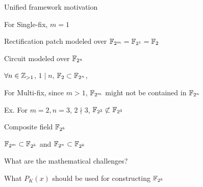 
\begin{frame}{\large Unified framework motivation}
\bi
	\item For Single-fix, $m=1$
	\bi
		\item Rectification patch modeled over ${\mathbb{F}}_{2^m} = {\mathbb{F}}_{2^1} = {\mathbb{F}}_2$
		\item Circuit modeled over ${\mathbb{F}}_{2^n}$ 
		\pause 
		\bi
		    \item $\forall n \in {\mathbb{Z}}_{>1}$, $1 \mid n$, ${\mathbb{F}}_2 \subset {\mathbb{F}}_{2^n}$, 
		\ei
	\ei
	\pause
	\vspace{0.1in}
	\item For Multi-fix, since $m > 1$, ${\mathbb{F}}_{2^m}$ might not be contained in ${\mathbb{F}}_{2^n}$
	\bi
		\pause
		\item Ex. For $m=2,n=3$, $2 \nmid 3$, ${\mathbb{F}}_{2^2} \not\subset {\mathbb{F}}_{2^3}$
	\ei  
	\vspace{0.1in}
	\pause
	\item Composite field ${\mathbb{F}}_{2^k}$ 
	\bi
		\item ${\mathbb{F}}_{2^m} \subset {\mathbb{F}}_{2^k}$ and ${\mathbb{F}}_{2^n} \subset {\mathbb{F}}_{2^k}$
	\pause
	\item What are the mathematical challenges?
	\pause
	\item What $P_K(x)$ should be used for constructing ${\mathbb{F}}_{2^k}$
	\ei
\ei
\end{frame}